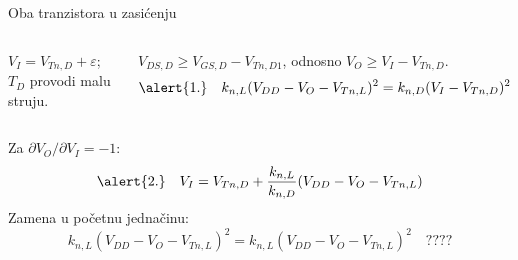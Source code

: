 \begin{frame}[label=09_1-s051]{Oba tranzistora u zasićenju}\setlength{\parskip}{2pt}\setlength{\abovedisplayskip}{4pt}\setlength{\belowdisplayskip}{4pt}\setlength{\abovedisplayshortskip}{3pt}\setlength{\belowdisplayshortskip}{3pt}
\begin{columns}[T,onlytextwidth]\centering {}$V_I=V_{Tn,D}+\varepsilon$; $T_D$ provodi malu struju.\par $V_{DS,D}\geq V_{GS,D}-V_{Tn,D1}$, odnosno $V_O\geq V_I-V_{Tn,D}$.
\[\alert{1.}\quad k_{n,L}(V_{DD}-V_O-V_{Tn,L})^2=k_{n,D}(V_I-V_{Tn,D})^2\]\end{columns}
Za $\partial V_O/\partial V_I=-1$:
\[\alert{2.}\quad V_I=V_{Tn,D}+\frac{k_{n,L}}{k_{n,D}}(V_{DD}-V_O-V_{Tn,L})\]
Zamena u početnu jednačinu:\[k_{n,L}(V_{DD}-V_O-V_{Tn,L})^2=k_{n,L}(V_{DD}-V_O-V_{Tn,L})^2\quad\text{????}\]

\end{frame}
